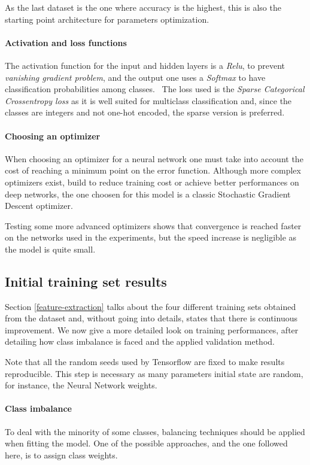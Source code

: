 As the last dataset is the one where accuracy is the highest, this is 
also the starting point architecture for parameters optimization.

\paragraph{Activation and loss functions}
The activation function for the input and hidden layers is a \emph{Relu}, 
to prevent \emph{vanishing gradient problem}, 
and the output one uses a \emph{Softmax} to have classification probabilities
among classes.~\cite{relu}\cite{soft}\cite{vanishing}
The loss used is the \emph{Sparse Categorical Crossentropy loss} as it 
is well suited for multiclass classification and, since 
the classes are integers and not one-hot encoded, the sparse version is preferred.~\cite{entropy}

\paragraph{Choosing an optimizer}
When choosing an optimizer for a neural network one must take into account the 
cost of reaching a minimum point on the error function.
Although more complex optimizers exist, build to reduce training 
cost or achieve better performances on deep networks, the one choosen 
for this model is a classic Stochastic Gradient Descent optimizer.

Testing some more advanced optimizers shows that convergence is reached faster on the 
networks used in the experiments, but the speed increase is negligible as the model
is quite small.

\subsection{Initial training set results}

Section \vref{feature-extraction} talks about the four different 
training sets obtained from the dataset and, without going into details, 
states that there is continuous improvement. 
We now give a more detailed look on training performances, after 
detailing how class imbalance is faced and the applied validation method.

Note that all the random seeds used by Tensorflow are fixed 
to make results reproducible. This step is necessary as many parameters initial 
state are random, for instance, the Neural Network weights.

\paragraph{Class imbalance}
To deal with the minority of some classes, balancing techniques should be 
applied when fitting the model. One of the possible approaches, and the one followed
here, is to assign class weights. 

